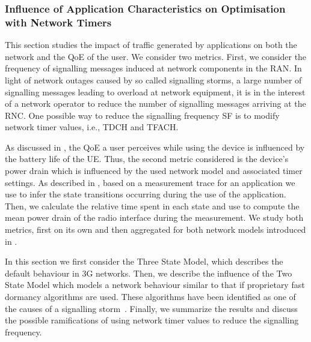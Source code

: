 \subsubsection*{Influence of Application Characteristics on Optimisation with Network Timers}\label{sec:network:network_traces:numerical_results:application_influence}
This section studies the impact of traffic generated by applications on both the network and the
\gls{QoE} of the user.
We consider two metrics.
First, we consider the frequency of signalling messages induced at network components in the \gls{RAN}.
In light of network outages caused by so called signalling storms, a large number of signalling messages leading to overload at network equipment, it is in the interest of a network operator to reduce the number of signalling messages arriving at the \gls{RNC}.
One possible way to reduce the signalling frequency \gls{SF} is to modify network timer values, i.e., \gls{TDCH} and \gls{TFACH}.

As discussed in , the \gls{QoE} a user perceives while using the device is influenced by the battery life of the \gls{UE}.
Thus, the second metric considered is the device’s power drain which is influenced by the used network model and associated timer settings.
As described in , based on a measurement trace for an application we use  to infer the state transitions occurring during the use of the application.
Then, we calculate the relative time spent in each state and use  to compute the mean power
drain of the radio interface during the measurement.
We study both metrics, first on its own and then aggregated for both network models introduced in .

In this section we first consider the Three State Model, which describes the default behaviour in \gls{3G} networks. 
Then, we describe the influence of the Two State Model which models a network behaviour similar to that if proprietary fast dormancy algorithms are used.
These algorithms have been identified as one of the causes of a signalling storm~\cite{NSN2011}.
Finally, we summarize the results and discuss the possible ramifications of using network timer values to reduce the signalling frequency.

